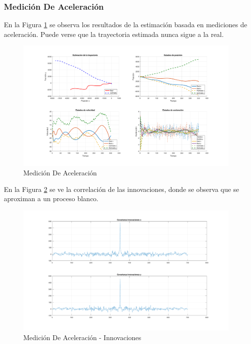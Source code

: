 		\subsubsection{Medición De Aceleración}
		
		En la Figura \ref{fig:ej2c} se observa los resultados de la estimación basada en mediciones de aceleración. Puede verse que la trayectoria estimada nunca sigue a la real.
		
		\begin{figure}[H]
			\centering
			\includegraphics[scale=0.5,trim={6,5cm 0 0 0}]{Figuras/graf_ej2c.pdf}
			\caption{Medición De Aceleración}
			\label{fig:ej2c}
		\end{figure}
		
		En la Figura \ref{fig:ej2c_innov} se ve la correlación de las innovaciones, donde se observa que se aproximan a un proceso blanco.
		
		\begin{figure}[H]
			\centering
			\includegraphics[width=1.0\textwidth,keepaspectratio]{Figuras/covinn_ej2c.pdf}
			\caption{Medición De Aceleración - Innovaciones}
			\label{fig:ej2c_innov}
		\end{figure}

